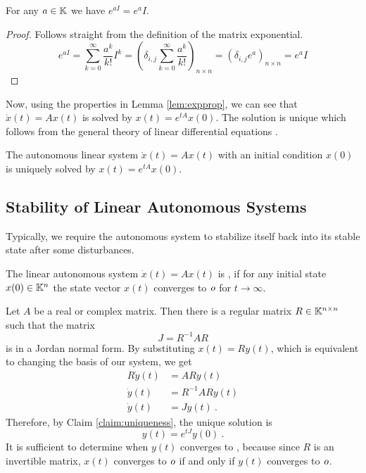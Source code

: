 \begin{lemma}
	\label{lem:matrixExpIdentity}
	For any $a\in\mathbb{K}$ we have $e^{a I}=e^{a}I$.
\end{lemma}

\begin{proof}
	Follows straight from the definition of the matrix exponential.
	$$e^{a I}=\sum^\infty_{k=0}\frac{a^k}{k!}I^k=\left(\delta_{i,j}\sum^\infty_{k=0}\frac{a^k}{k!}\right)_{n\times n}=\left(\delta_{i,j}e^a\right)_{n\times n}=e^aI$$
\end{proof}

Now, using the properties in Lemma \ref{lem:expprop}, we can see that $\dot{x}(t)=Ax(t)$ is solved by $x(t)=e^{tA}x(0)$. The solution is unique which follows from the general theory of linear differential equations \cite[see][Věta 13.5.1]{Pick}.

\begin{claim}
\label{claim:uniqueness}
	The autonomous linear system $\dot{x}(t)=Ax(t)$ with an initial condition $x(0)$ is uniquely solved by $x(t)=e^{tA}x(0)$.
\end{claim}

\subsection{Stability of Linear Autonomous Systems}

Typically, we require the autonomous system to stabilize itself back into its stable state after some disturbances.

\begin{definition}
	The linear autonomous system $\dot{x}(t)=Ax(t)$ is , if for any initial state $x(0)\in\mathbb{K}^n$ the state vector $x(t)$ converges to $\textit{o}$ for $t\to\infty$.
\end{definition}

Let $A$ be a real or complex matrix. Then there is a regular matrix $R\in \mathbb{K}^{n\times n}$ such that the matrix
$$J=R^{-1}AR$$
is in a Jordan normal form. By substituting $x(t)=Ry(t)$, which is equivalent to changing the basis of our system, we get 
\begin{align*}
	R\dot{y}(t)&=ARy(t) \\
	\dot{y}(t)&=R^{-1}ARy(t) \\
	\dot{y}(t)&=Jy(t)\ .
\end{align*}
Therefore, by Claim \ref{claim:uniqueness}, the unique solution is
$$y(t)=e^{tJ}y(0)\ .$$
It is sufficient to determine when $y(t)$ converges to \nullvector, because since $R$ is an invertible matrix, $x(t)$ converges to $\textit{o}$ if and only if $y(t)$ converges to $\textit{o}$.

